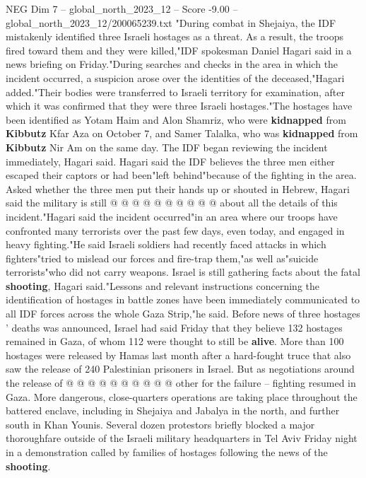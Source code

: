 \begin{textsample}{NEG Dim 7 – global\_north\_2023\_12 – Score -9.00 – global\_north\_2023\_12/200065239.txt}  \label{ex:f7_neg_144}
"During combat in Shejaiya, the IDF mistakenly identified three Israeli hostages as a threat.
As a result, the troops fired toward them and they were killed,"IDF spokesman Daniel Hagari said in a news briefing on Friday."During searches and checks in the area in which the incident occurred, a suspicion arose over the identities of the deceased,"Hagari added."Their bodies were transferred to Israeli territory for examination, after which it was confirmed that they were three Israeli hostages."The hostages have been identified as Yotam Haim and Alon Shamriz, who were \textbf{kidnapped} from \textbf{Kibbutz} Kfar Aza on October 7, and Samer Talalka, who was \textbf{kidnapped} from \textbf{Kibbutz} Nir Am on the same day.
The IDF began reviewing the incident immediately, Hagari said.
Hagari said the IDF believes the three men either escaped their captors or had been"left behind"because of the fighting in the area.
Asked whether the three men put their hands up or shouted in Hebrew, Hagari said the military is still @ @ @ @ @ @ @ @ @ @ about all the details of this incident."Hagari said the incident occurred"in an area where our troops have confronted many terrorists over the past few days, even today, and engaged in heavy fighting."He said Israeli soldiers had recently faced attacks in which fighters"tried to mislead our forces and fire-trap them,"as well as"suicide terrorists"who did not carry weapons.
Israel is still gathering facts about the fatal \textbf{shooting}, Hagari said."Lessons and relevant instructions concerning the identification of hostages in battle zones have been immediately communicated to all IDF forces across the whole Gaza Strip,"he said.
Before news of three hostages ' deaths was announced, Israel had said Friday that they believe 132 hostages remained in Gaza, of whom 112 were thought to still be \textbf{alive}.
More than 100 hostages were released by Hamas last month after a hard-fought truce that also saw the release of 240 Palestinian prisoners in Israel.
But as negotiations around the release of @ @ @ @ @ @ @ @ @ @ other for the failure -- fighting resumed in Gaza.
More dangerous, close-quarters operations are taking place throughout the battered enclave, including in Shejaiya and Jabalya in the north, and further south in Khan Younis.
Several dozen protestors briefly blocked a major thoroughfare outside of the Israeli military headquarters in Tel Aviv Friday night in a demonstration called by families of hostages following the news of the \textbf{shooting}.

\end{textsample}
